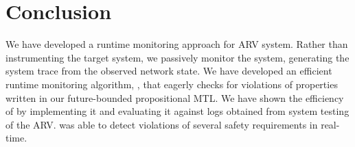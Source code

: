 
\section{Conclusion}
We have developed a runtime monitoring approach for ARV system. 
Rather than instrumenting the target system, we passively monitor the system, generating the system trace from the observed network state.
We have developed an efficient runtime monitoring algorithm, \monitor, that eagerly checks for violations of properties written in our future-bounded propositional MTL. 
We have shown the efficiency of \monitor by implementing it and evaluating it against logs obtained from system testing of the ARV. 
\monitor was able to detect violations of several safety requirements in real-time.
